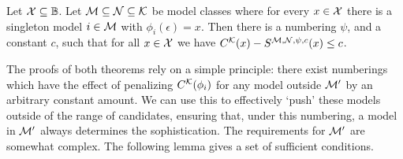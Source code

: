 \begin{theorem}[Overfitting]
Let ${\cal X} \subseteq {\mathbb B}$. Let ${\cal M} \subseteq {\cal N} \subseteq {\cal K}$ be model classes where for every $x\in{\cal X}$ there is a singleton model $i\in{\cal M}$ with $\phi_i(\epsilon)=x$. Then there is a numbering $\psi$, and a constant $c$, such that for all $x\in{\cal X}$ we have $C^{\cal K}(x)-S^{{\cal M},{\cal N},\psi,c}(x) \leq c$.\label{theorem:overfitting}
\end{theorem}
The proofs of both theorems rely on a simple principle: there exist numberings which have the effect of penalizing $C^{\cal K}(\phi_i)$ for any model outside ${\cal M}'$ by an arbitrary constant amount. We can use this to effectively `push' these models outside of the range of candidates, ensuring that, under this numbering, a model in ${\cal M}'$ always determines the sophistication. The requirements for ${\cal M}'$ are somewhat complex. The following lemma gives a set of sufficient conditions.

